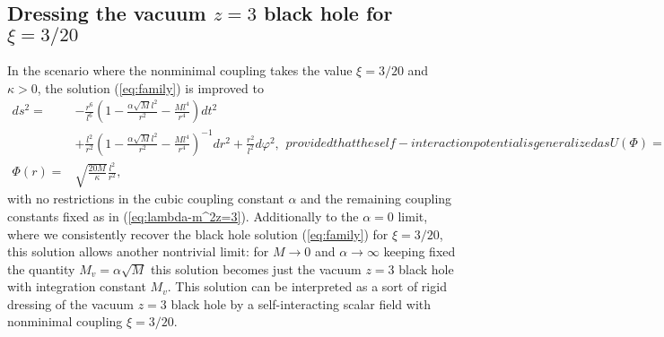 \documentclass[prd,twocolumn,superscriptaddress,amsmath,amssymb,nofootinbib]{revtex4-1}
\begin{document}
\subsection{\label{family3_3d}Dressing the vacuum $z=3$ black hole for
$\xi=3/20$}

In the scenario where the nonminimal coupling takes the value
$\xi=3/20$ and $\kappa>0$, the solution (\ref{eq:family}) is
improved to
\begin{subequations}\label{fam3}
\begin{align}
ds^2={}&-\frac{r^6}{l^6}
\left(1-\frac{\alpha\sqrt{M}l^2}{r^2}-\frac{Ml^4}{r^4}\right)dt^2
\nonumber\\
&+\frac{l^2}{r^2}
\left(1-\frac{\alpha\sqrt{M}l^2}{r^2}-\frac{Ml^4}{r^4}\right)^{-1}dr^2
+ \frac{r^2}{l^{2}}d\varphi^2,
\label{metricfamily3} \\
\Phi(r)={}&\sqrt{\frac{20M}{\kappa}}\frac{l^2}{r^2},
\end{align}
provided that the self-interaction potential is generalized as
\begin{equation}
U(\Phi) = -\frac{1}{20l^2}\Phi^2 -
\frac{\alpha\sqrt{\kappa}}{5\sqrt{5}l^2}\Phi^3
-\frac{37\kappa}{800l^2}\Phi^4,
\end{equation}
\end{subequations}
with no restrictions in the cubic coupling constant $\alpha$
and the remaining coupling constants fixed as in
(\ref{eq:lambda-m^2z=3}). Additionally to the $\alpha=0$ limit,
where we consistently recover the black hole solution
(\ref{eq:family}) for $\xi=3/20$, this solution allows another
nontrivial limit: for $M\rightarrow0$ and
$\alpha\rightarrow\infty$ keeping fixed the quantity
$M_v=\alpha\sqrt{M}$ this solution becomes just the vacuum
$z=3$ black hole \cite{AyonBeato:2009nh} with integration
constant $M_v$. This solution can be interpreted as a sort of
rigid dressing of the vacuum $z=3$ black hole by a
self-interacting scalar field with nonminimal coupling
$\xi=3/20$.
\end{document}
